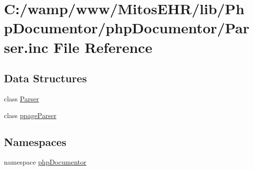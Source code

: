 \hypertarget{_parser_8inc}{\section{\-C\-:/wamp/www/\-Mitos\-E\-H\-R/lib/\-Php\-Documentor/php\-Documentor/\-Parser.inc \-File \-Reference}
\label{_parser_8inc}
}
\subsection*{\-Data \-Structures}
\begin{DoxyCompactItemize}
\item 
class \hyperlink{class_parser}{\-Parser}
\item 
class \hyperlink{classppage_parser}{ppage\-Parser}
\end{DoxyCompactItemize}
\subsection*{\-Namespaces}
\begin{DoxyCompactItemize}
\item 
namespace \hyperlink{namespacephp_documentor}{php\-Documentor}
\end{DoxyCompactItemize}
